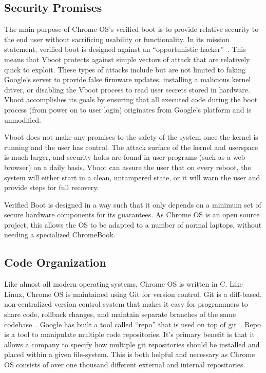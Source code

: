 \documentclass[../report.tex]{subfiles}
\begin{document}
\onehalfspacing

\newpage
{}

\subsection{Security Promises}

The main purpose of Chrome OS's verified boot is to provide relative security to the end user without sacrificing usability or functionality. 
In its mission statement, verified boot is designed against an ``opportunistic hacker''~\cite{vboot-design-doc}.
This means that Vboot protects against simple vectors of attack that are relatively quick to exploit.
These types of attacks include but are not limited to faking Google's server to provide false firmware updates, installing a malicious kernel driver, or disabling the Vboot process to read user secrets stored in hardware.
Vboot accomplishes its goals by ensuring that all executed code during the boot process (from power on to user login) originates from Google's platform and is unmodified. 

Vboot does not make any promises to the safety of the system once the kernel is running and the user has control. 
The attack surface of the kernel and userspace is much larger, and security holes are found in user programs (such as a web browser) on a daily basis.
Vboot can assure the user that on every reboot, the system will either start in a clean, untampered state, or it will warn the user and provide steps for full recovery.

Verified Boot is designed in a way such that it only depends on a minimum set of secure hardware components for its guarantees.
As Chrome OS is an open source project, this allows the OS to be adapted to a number of normal laptops, without needing a specialized ChromeBook.

\subsection{Code Organization}

Like almost all modern operating systems, Chrome OS is written in C.
Like Linux, Chrome OS is maintained using Git for version control. 
Git is a diff-based, non-centralized version control system that makes it easy for programmers to share code, rollback changes, and maintain separate branches of the same codebase~\cite{git}.
Google has built a tool called ``repo'' that is used on top of git~\cite{repo}. 
Repo is a tool to manipulate multiple code repositories. 
It's primary benefit is that it allows a company to specify how multiple git repositories should be installed and placed within a given file-system.
This is both helpful and necessary as Chrome OS consists of over one thousand different external and internal repositories. 
\end{document}
